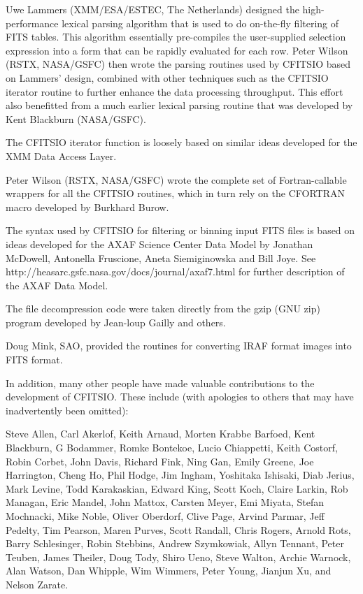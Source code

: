 \documentclass[11pt]{book}
\begin{document}
Uwe Lammers (XMM/ESA/ESTEC, The Netherlands) designed the
high-performance lexical parsing algorithm that is used to do
on-the-fly filtering of FITS tables.  This algorithm essentially
pre-compiles the user-supplied selection expression into a form that
can be rapidly evaluated for each row.  Peter Wilson (RSTX, NASA/GSFC)
then wrote the parsing routines used by CFITSIO based on Lammers'
design, combined with other techniques such as the CFITSIO iterator
routine to further enhance the data processing throughput.  This effort
also benefitted from a much earlier lexical parsing routine that was
developed by Kent Blackburn (NASA/GSFC).

The CFITSIO iterator function is loosely based on similar ideas
developed for the XMM Data Access Layer.

Peter Wilson (RSTX, NASA/GSFC) wrote the complete set of
Fortran-callable wrappers for all the CFITSIO routines, which in turn
rely on the CFORTRAN macro developed by Burkhard Burow.

The syntax used by CFITSIO for filtering or binning input FITS files is
based on ideas developed for the AXAF Science Center Data Model by
Jonathan McDowell, Antonella Fruscione, Aneta Siemiginowska and Bill
Joye. See http://heasarc.gsfc.nasa.gov/docs/journal/axaf7.html for
further description of the AXAF Data Model.

The file decompression code were taken directly from the gzip (GNU zip)
program developed by Jean-loup Gailly and others.

Doug Mink, SAO, provided the routines for converting IRAF format
images into FITS format.

In addition, many other people have made valuable contributions to the
development of CFITSIO.  These include (with apologies to others that may
have inadvertently been omitted):

Steve Allen, Carl Akerlof, Keith Arnaud, Morten Krabbe Barfoed, Kent
Blackburn, G Bodammer, Romke Bontekoe, Lucio Chiappetti, Keith Costorf,
Robin Corbet, John Davis,  Richard Fink, Ning Gan, Emily Greene, Joe
Harrington, Cheng Ho, Phil Hodge, Jim Ingham, Yoshitaka Ishisaki, Diab
Jerius, Mark Levine, Todd Karakaskian, Edward King, Scott Koch,  Claire
Larkin, Rob Managan, Eric Mandel, John Mattox, Carsten Meyer, Emi
Miyata, Stefan Mochnacki, Mike Noble, Oliver Oberdorf, Clive Page,
Arvind Parmar, Jeff Pedelty, Tim Pearson, Maren Purves, Scott Randall,
Chris Rogers, Arnold Rots, Barry Schlesinger, Robin Stebbins, Andrew
Szymkowiak, Allyn Tennant, Peter Teuben, James Theiler, Doug Tody,
Shiro Ueno, Steve Walton, Archie Warnock, Alan Watson, Dan Whipple, Wim
Wimmers, Peter Young, Jianjun Xu, and Nelson Zarate.

\end{document}
